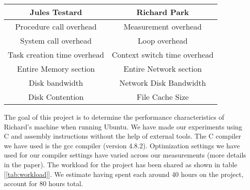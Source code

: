 \begin{table*}[t]
\centering
\begin{tabular}{| c | c |}
\hline
Jules Testard & Richard Park \\
\hline
 Procedure call overhead & Measurement overhead \\
System call overhead & Loop overhead \\
Task creation time overhead & Context switch time overhead \\
Entire Memory section & Entire Network section \\
Disk bandwidth & Network Disk Bandwidth \\
Disk Contention & File Cache Size \\
\hline
\end{tabular}
\caption{Workload}
\label{tab:workload}
\end{table*}

The goal of this project is to determine the performance characteristics of Richard's machine when running Ubuntu. We have made our experiments using C and assembly instructions without the help of external tools. The C compiler we have used is the gcc compiler (version 4.8.2). Optimization settings we have used for our compiler settings have varied across our measurements (more details in the paper). The workload for the project has been shared as shown in table [\ref{tab:workload}]. We estimate having spent each around 40 hours on the project, account for 80 hours total.